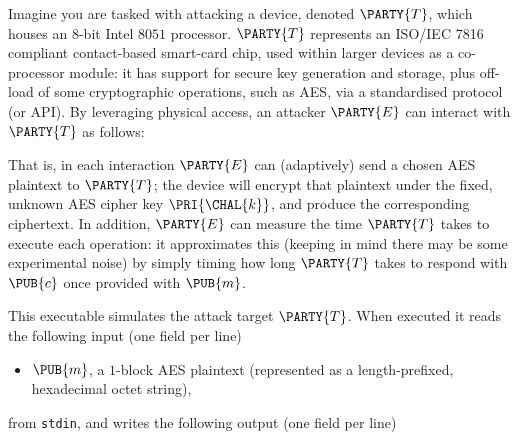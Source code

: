 %



Imagine you are tasked with attacking a device, denoted $\PARTY{T}$, 
which houses an $8$-bit Intel $8051$ processor.
$\PARTY{T}$ represents an ISO/IEC 7816 compliant contact-based smart-card
chip, used within larger devices as a co-processor module: it has support
for secure key generation and storage, plus off-load of some cryptographic 
operations, such as AES, via a standardised protocol (or API).
By leveraging physical access, 
an attacker $\PARTY{E}$ can interact with $\PARTY{T}$ as follows:

\begin{center}

\end{center}

\noindent
That is, in each interaction $\PARTY{E}$ can (adaptively) send 
a chosen AES  plaintext
to $\PARTY{T}$; the device will
encrypt that  plaintext under the fixed, unknown AES cipher key $\PRI{\CHAL{k}}$,
and produce 
the corresponding ciphertext.
In addition, $\PARTY{E}$ can measure the time $\PARTY{T}$ takes to execute 
each operation: it approximates this 
(keeping in mind there may be some experimental noise) 
by simply timing how long $\PARTY{T}$ takes to respond with $\PUB{c}$ once
provided with $\PUB{m}$.




This executable simulates the attack target $\PARTY{T}$.  When executed it 
 reads the following  input (one field per line)

\begin{itemize}
\item $\PUB{m}$,
      a  ${1}$-block AES plaintext
      (represented as a  length-prefixed, hexadecimal octet   string),
\end{itemize}

\noindent
from \lstinline[language={bash}]{stdin},
and 
writes the following output (one field per line)

